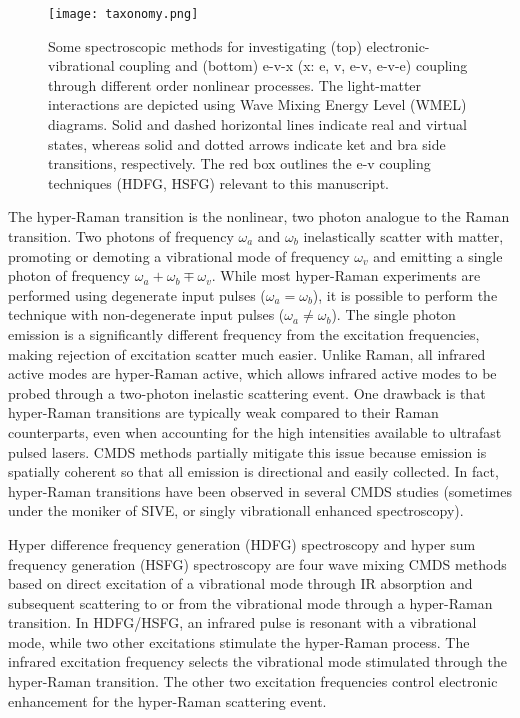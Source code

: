 \documentclass[aip, jcp, reprint, onecolumn, nofootinbib]{revtex4-2}
\begin{document}
\begin{figure}[!htbp]
	\centering
	\texttt{[image: taxonomy.png]}
	\caption{
		Some spectroscopic methods for investigating (top) electronic-vibrational coupling and (bottom) e-v-x (x: e, v, e-v, e-v-e) coupling through different order nonlinear processes.
		The light-matter interactions are depicted using Wave Mixing Energy Level (WMEL) diagrams.\cite{RN286}
		Solid and dashed horizontal lines indicate real and virtual states, whereas solid and dotted arrows indicate ket and bra side transitions, respectively. 
		The red box outlines the e-v coupling techniques (HDFG, HSFG) relevant to this manuscript.
	} 
	\label{fig:comparisonwmel}
\end{figure}

The hyper-Raman transition is the nonlinear, two photon analogue to the Raman transition.\cite{Terhune1965, Cyvin1965, Andrews1978}
Two photons of frequency $\omega_a$ and $\omega_b$ inelastically scatter with matter, promoting or demoting a vibrational mode of frequency $\omega_v$ and emitting a single photon of frequency $\omega_a + \omega_b \mp \omega_v$. 
While most hyper-Raman experiments are performed using degenerate input pulses ($\omega_a = \omega_b$),\cite{RN515} it is possible to perform the technique with non-degenerate input pulses ($\omega_a \neq \omega_b$). \cite{Denisov1986, Kozich2007}
The single photon emission is a significantly different frequency from the excitation frequencies, making rejection of excitation scatter much easier.
Unlike Raman, all infrared active modes are hyper-Raman active, which allows infrared active modes to be probed through a two-photon inelastic scattering event. \cite{Andrews1978}
One drawback is that hyper-Raman transitions are typically weak compared to their Raman counterparts, even when accounting for the high intensities available to ultrafast pulsed lasers.\cite{RN515, Kelley2010}
CMDS methods partially mitigate this issue because emission is spatially coherent so that all emission is directional and easily collected.
In fact, hyper-Raman transitions have been observed in several CMDS studies (sometimes under the moniker of SIVE, or singly vibrationall enhanced spectroscopy).\cite{Zilian1994, RN350, RN351, RN352, RN353, Chen1998, RN362, RN418, Hanninen2018, Wang2021, Bonn2024, McDonnell2024}

Hyper difference frequency generation (HDFG) spectroscopy and hyper sum frequency generation (HSFG) spectroscopy are four wave mixing CMDS methods based on direct excitation of a vibrational mode through IR absorption and subsequent scattering to or from the vibrational mode through a hyper-Raman transition.
In HDFG/HSFG, an infrared pulse is resonant with a vibrational mode, while two other excitations stimulate the hyper-Raman process.
The infrared excitation frequency selects the vibrational mode stimulated through the hyper-Raman transition.
The other two excitation frequencies control electronic enhancement for the hyper-Raman scattering event.
\end{document}
